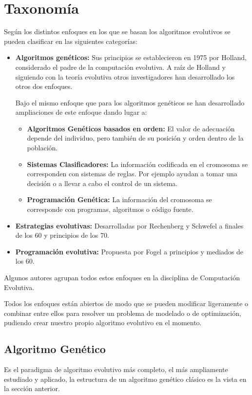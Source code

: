 \documentclass[12pt, twoside, openright]{report} %
\begin{document}
\section{Taxonomía}
Según los distintos enfoques en los que se basan los algoritmos evolutivos se pueden clasificar en las siguientes categorías:
\begin{itemize}
	\item \textbf{Algoritmos genéticos:} Sus principios se establecieron en 1975 por Holland, considerado el padre de la computación evolutiva. A raíz de Holland y siguiendo con la teoría evolutiva otros investigadores han desarrollado los otros dos enfoques.

	      Bajo el mismo enfoque que para los algoritmos genéticos se han desarrollado ampliaciones de este enfoque dando lugar a:
	      \begin{itemize}
		      \item \textbf{Algoritmos Genéticos basados en orden:} El valor de adecuación depende del individuo, pero también de su posición y orden dentro de la población.
		      \item \textbf{Sistemas Clasificadores:} La información codificada en el cromosoma se corresponden con sistemas de reglas. Por ejemplo ayudan a tomar una decisión o a llevar a cabo el control de un sistema.
		      \item \textbf{Programación Genética:} La información del cromosoma se corresponde con programas, algoritmos o código fuente.
	      \end{itemize}
	\item \textbf{Estrategias evolutivas:} Desarrolladas por Rechenberg y Schwefel a finales de los 60 y principios de los 70.
	\item \textbf{Programación evolutiva:} Propuesta por Fogel a principios y mediados de los 60.
\end{itemize}

Algunos autores agrupan todos estos enfoques en la disciplina de Computación Evolutiva.

Todos los enfoques están abiertos de modo que se pueden modificar ligeramente o combinar entre ellos para resolver un problema de modelado o de optimización, pudiendo crear nuestro propio algoritmo evolutivo en el momento.

\subsection{Algoritmo Genético}
Es el paradigma de algoritmo evolutivo más completo, el más ampliamente estudiado y aplicado, la estructura de un algoritmo genético clásico es la vista en la sección anterior.
\end{document}
